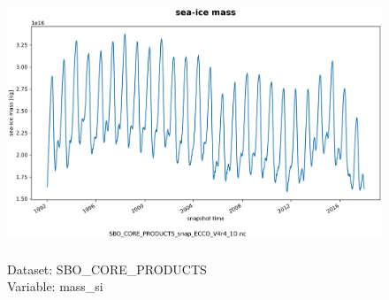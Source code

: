 \begin{figure}[H]
\centering
\includegraphics[scale=0.5]{../images/plots/oneD_plots/SBO_Core_Products/mass_si.png}
\caption{\\Dataset: SBO\_CORE\_PRODUCTS\\Variable: mass\_si}
\label{tab:table-SBO_CORE_PRODUCTS_mass_si-Plot}
\end{figure}
\pagebreak
